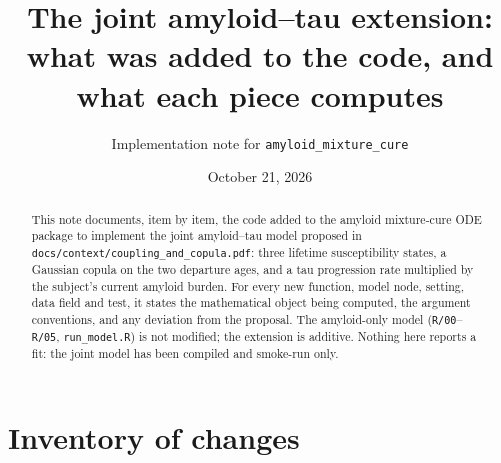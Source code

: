 \documentclass[11pt]{article}
\title{The joint amyloid--tau extension:\\ what was added to the code, and what each piece computes}
\author{Implementation note for \texttt{amyloid\_mixture\_cure}}
\date{October 21, 2026}
\newcommand{\code}[1]{\texttt{#1}}
\begin{document}
\maketitle

\begin{abstract}
\noindent
This note documents, item by item, the code added to the amyloid mixture-cure ODE
package to implement the joint amyloid--tau model proposed in
\code{docs/context/coupling\_and\_copula.pdf}: three lifetime susceptibility
states, a Gaussian copula on the two departure ages, and a tau progression rate
multiplied by the subject's current amyloid burden. For every new function,
model node, setting, data field and test, it states the mathematical object
being computed, the argument conventions, and any deviation from the proposal.
The amyloid-only model (\code{R/00}--\code{R/05}, \code{run\_model.R}) is not
modified; the extension is additive. Nothing here reports a fit: the joint model
has been compiled and smoke-run only.
\end{abstract}

\tableofcontents

\section{Inventory of changes}
\end{document}
